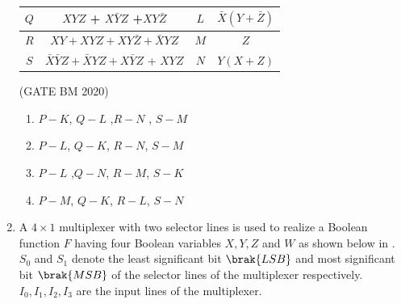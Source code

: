 \begin{enumerate}[label=\arabic*.,ref=\theenumi]
\begin{table}[H]
{\begin{tabular}{|c|c|c|c|}
	\hline 

	$Q$ & $XYZ$ + $X\bar{Y}Z$ +$XY\bar{Z}$ & $L$ & $\bar{X}(Y+\bar{Z})$ \\

	\hline 

	$R$ & $XY + XYZ +XY\bar{Z} + \bar{X}YZ$ & $M$ & $Z$ \\

	\hline

	$S$ & $\bar{X}\bar{Y}Z + \bar{X}YZ + X\bar{Y}Z$ + $XYZ$ & $N$ & $Y(X+Z)$ \\

	\hline 
\end{tabular}
		}
		\caption{}
		\label{fig:GATE BM 2020}
	\end{table}
		\hfill(GATE BM 2020)
	\begin{enumerate}[label=(\Alph*)]
			\item $P-K$, $Q-L$ ,$R-N$ , $S-M$ \\
			\item $P-L$, $Q-K$, $R-N$, $S-M$ \\
			\item $P-L$ ,$Q-N$, $R-M$, $S-K$ \\
			\item $P-M$, $Q-K$, $R-L$, $S-N$ \\
	\end{enumerate}

\item A $ 4\times1$ multiplexer with two selector lines is used to realize a Boolean function $F$ having four Boolean variables $X, Y, Z$ and $W$ as shown below
in  .
	 $S_0$ and $S_1$ denote the least significant bit $\brak{LSB}$ and most significant bit $\brak{MSB}$ of the selector lines of the multiplexer respectively. $I_0, I_1, I_2,I_3$ are the input lines of the multiplexer.


\end{enumerate}

